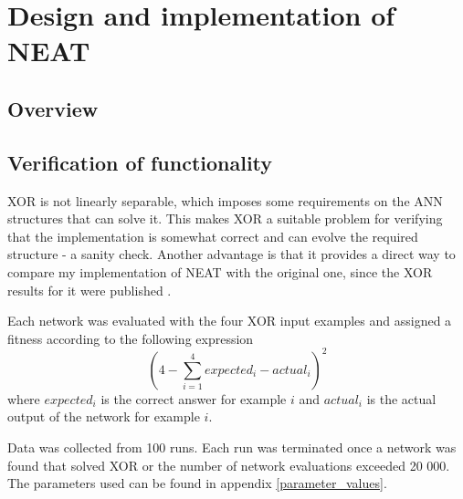 \newpage

\section{Design and implementation of NEAT}

\subsection{Overview}

\subsection{Verification of functionality}
XOR is not linearly separable, which imposes some requirements on the ANN structures that can solve it.
This makes XOR a suitable problem for verifying that the implementation is somewhat correct and can evolve
the required structure - a sanity check. Another advantage is that it provides a direct way to compare my
implementation of NEAT with the original one, since the XOR results for it were published \cite{neat_main}.

%

Each network was evaluated with the four XOR input examples and assigned a fitness according to the following expression
\begin{equation*} \label{eq:1}
    (4 - \sum_{i=1}^{4} expected_{i} - actual_{i})^2
\end{equation*}
where $expected_{i}$ is the correct answer for example $i$ and $actual_{i}$ is the actual output of the network for example $i$.

Data was collected from 100 runs. Each run was terminated once a network was found that solved
XOR or the number of network evaluations exceeded 20 000. The parameters used can be found in appendix \ref{parameter_values}.

